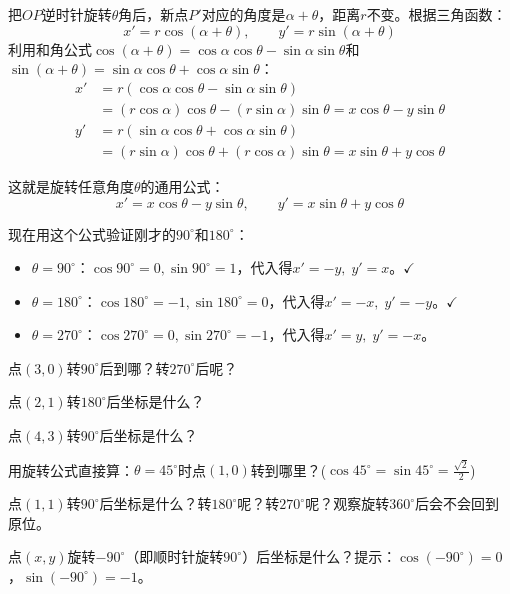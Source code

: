 \documentclass[a4paper,12pt]{ctexart}
\begin{document}
\begin{center}
\end{center}

把$OP$逆时针旋转$\theta$角后，新点$P'$对应的角度是$\alpha+\theta$，距离$r$不变。根据三角函数：
\[
x' = r\cos(\alpha+\theta),\qquad y' = r\sin(\alpha+\theta)
\]
利用和角公式$\cos(\alpha+\theta)=\cos\alpha\cos\theta-\sin\alpha\sin\theta$和$\sin(\alpha+\theta)=\sin\alpha\cos\theta+\cos\alpha\sin\theta$：
\begin{align*}
x' &= r(\cos\alpha\cos\theta-\sin\alpha\sin\theta) \\
   &= (r\cos\alpha)\cos\theta-(r\sin\alpha)\sin\theta
    = x\cos\theta-y\sin\theta\\[2mm]
y' &= r(\sin\alpha\cos\theta+\cos\alpha\sin\theta) \\
   &= (r\sin\alpha)\cos\theta+(r\cos\alpha)\sin\theta
    = x\sin\theta+y\cos\theta
\end{align*}

这就是旋转任意角度$\theta$的通用公式：
\[
x' = x\cos\theta - y\sin\theta,\qquad y' = x\sin\theta + y\cos\theta
\]

现在用这个公式验证刚才的$90^\circ$和$180^\circ$：
\begin{itemize}
\item $\theta=90^\circ$：$\cos90^\circ=0,\sin90^\circ=1$，代入得$x'=-y,\;y'=x$。$\checkmark$
\item $\theta=180^\circ$：$\cos180^\circ=-1,\sin180^\circ=0$，代入得$x'=-x,\;y'=-y$。$\checkmark$
\item $\theta=270^\circ$：$\cos270^\circ=0,\sin270^\circ=-1$，代入得$x'=y,\;y'=-x$。
\end{itemize}

\begin{exercise}[旋转练习]
\item 点$(3,0)$转$90^\circ$后到哪？转$270^\circ$后呢？
\item 点$(2,1)$转$180^\circ$后坐标是什么？
\item 点$(4,3)$转$90^\circ$后坐标是什么？
\item 用旋转公式直接算：$\theta=45^\circ$时点$(1,0)$转到哪里？($\cos45^\circ=\sin45^\circ=\frac{\sqrt2}{2}$)
\item 点$(1,1)$转$90^\circ$后坐标是什么？转$180^\circ$呢？转$270^\circ$呢？观察旋转$360^\circ$后会不会回到原位。
\item 点$(x,y)$旋转$-90^\circ$（即顺时针旋转$90^\circ$）后坐标是什么？提示：$\cos(-90^\circ)=0$，$\sin(-90^\circ)=-1$。
\end{exercise}
\end{document}
